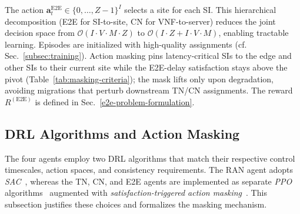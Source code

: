 \documentclass[12pt,lettersize,journal,onecolumn]{IEEEtran}
\begin{document}
The action $\mathbf{a}^{\text{E2E}}_t \in \{0,\ldots,Z-1\}^{I}$ selects a site for each SI. This hierarchical decomposition (E2E for SI-to-site, CN for VNF-to-server) reduces the joint decision space from $\mathcal{O}(I \cdot V \cdot M \cdot Z)$ to $\mathcal{O}(I \cdot Z+I \cdot V \cdot M)$, enabling tractable learning. 
Episodes are initialized with high-quality assignments (cf. Sec.~\ref{subsec:training}). Action masking pins latency-critical SIs to the edge and other SIs to their current site while the E2E-delay satisfaction stays above the pivot (Table~\ref{tab:masking-criteria}); the mask lifts only upon degradation, avoiding migrations that perturb downstream TN/CN assignments.
The reward $R^{\mathrm{(E2E)}}$ is defined in Sec.~\ref{e2e-problem-formulation}.

\subsection{DRL Algorithms and Action Masking} \label{subsec:drl-masking}
The four agents employ two DRL algorithms that match their respective control timescales, action spaces, and consistency requirements. The RAN agent adopts \textit{SAC}~\cite{icml18haarnoja}, whereas the TN, CN, and E2E agents are implemented as separate \textit{PPO} algorithms~\cite{prep17schulman} augmented with \textit{satisfaction-triggered action masking}~\cite{flairs22huang}. This subsection justifies these choices and formalizes the masking mechanism.
\end{document}
